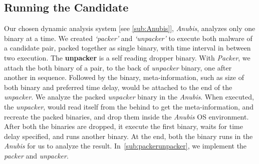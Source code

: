 \subsection{Running the Candidate}
\label{sub:Running the Candidate}
Our chosen dynamic analysis system [see \autoref{sub:Anubis}], \emph{Anubis}, analyzes only one binary at a time.
We created \emph{`packer'} and \emph{`unpacker'} to execute both malware of a candidate pair, packed together as single binary, with time interval in between two execution.
The \textbf{unpacker} is a self reading dropper binary.
With \emph{Packer}, we attach the both binary of a pair, to the back of \emph{unpacker} binary, one after another in sequence.
Followed by the binary, meta-information, such as size of both binary and preferred time delay, would be attached to the end of the \emph{unpacker}.
We analyze the packed \emph{unpacker} binary in the \emph{Anubis}.
When executed, the \emph{unpacker}, would read itself from the behind to get the meta-information, and recreate the packed binaries, and drop them inside the \emph{Anubis} OS environment.
After both the binaries are dropped, it execute the first binary, waits for time delay specified, and runs another binary.
At the end, both the binary runs in the \emph{Anubis} for us to analyze the result.
In~\autoref{sub:packerunpacker}, we implement the \emph{packer} and \emph{unpacker}.
